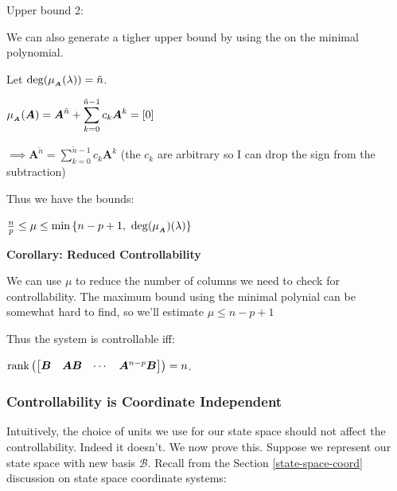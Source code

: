 \documentclass[11pt]{article}
\begin{document}
  \vspace{12pt}

  Upper bound 2:

  We can also generate a tigher upper bound by using the on the minimal polynomial.

  Let \(\mathrm{deg}{\left( \mu_{_{\bm{A}}}(\lambda) \right)} = \tilde{n}\).

  \(\mu_{_{\bm{A}}}(\bm{A}) = \displaystyle
  \bm{A}^{\tilde{n}} + \sum_{k = 0}^{\tilde{n} - 1} c_k\bm{A}^k = [0]\)

  \(\implies \bm{A}^{\tilde{n}} = \displaystyle \sum_{k = 0}^{\tilde{n} - 1} c_k\bm{A}^k\) (the \(c_k\) are arbitrary so I can
  drop the sign from the subtraction)

  \vspace{12pt}

  Thus we have the bounds:

  \(\frac{n}{p} \le \mu \le \min{\left\{ n - p + 1,\ \mathrm{deg}{\left( \mu_{_{\bm{A}}} \right)}(\lambda) \right\}}\)

  \pagebreak


  \textbf{Corollary: Reduced Controllability}

  We can use \(\mu\) to reduce the number of columns we need to check for controllability. The maximum bound using
  the minimal polynial can be somewhat hard to find, so we'll estimate \(\mu \le n - p + 1\)

  Thus the system is controllable iff:

  \(\rank{\left( \begin{bmatrix} \bm{B} & \bm{AB} & \cdots & \bm{A}^{n - p}\bm{B}\end{bmatrix} \right)} = n\).

  \subsubsection{Controllability is Coordinate Independent}

  Intuitively, the choice of units we use for our state space should not affect the controllability. Indeed
  it doesn't. We now prove this. Suppose we represent our state space with new basis \(\mathcal{B}\). Recall from
  the Section \ref{state-space-coord} discussion on state space coordinate systems:
\end{document}
